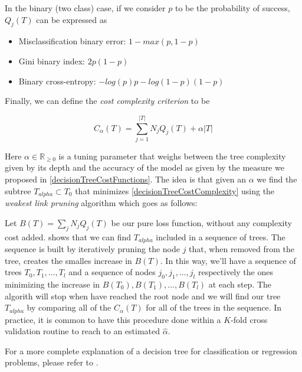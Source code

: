 \documentclass{article}%
\theoremstyle{definition}
\begin{document}
In the binary (two class) case, if we consider $p$ to be the probability of success, $Q_j(T)$ can be expressed as

\begin{itemize}
	\item Misclassification binary error: $1 - max(p, 1-p)$
	\item Gini binary index: $ 2p(1-p) $
	\item Binary cross-entropy: $ -log(p)p - log(1- p)(1-p) $
\end{itemize}\label{decisionTreeCostFunctions}

Finally, we can define the \textit{cost complexity criterion} to be 

\begin{equation}
C_\alpha(T)  = \sum_{j=1}^{|T|} N_j Q_j(T)  + \alpha|T| 
\end{equation}\label{decisionTreeCostComplexity}

Here  $\alpha \in \mathbb{R}_{\geq 0}$ is a tuning parameter that weighs between the tree complexity given by its depth and the accuracy of the model as given by the measure we proposed in \ref{decisionTreeCostFunctions}. The idea is that given an $\alpha$ we find the subtree $T_{alpha} \subset T_0$ that minimizes \ref{decisionTreeCostComplexity} using the \textit{weakest link pruning} algorithm which goes as follows:

Let  $B(T)  = \sum_{j} N_j Q_j(T) $ be our pure loss function, without any complexity cost added. \cite{breiman-cart84} shows that we can find $T_{alpha}$ included in a sequence of trees. The sequence is built by iteratively pruning the node $j$ that, when removed from the tree, creates the smalles increase in $B(T)$. In this way, we'll have a sequence of trees $T_0,T_1,...,T_l$ and a sequence of nodes $j_0, j_1,...,j_l$ respectively the ones minimizing the increase in $B(T_0),B(T_1),...,B(T_l)$ at each step. The algorith will stop when have reached the root node and we will find our tree $T_{alpha}$ by comparing all of the $C_\alpha(T)$ for all of the trees in the sequence. In practice, it is common to have this procedure done within a $K$-fold cross validation routine to reach to an estimated $\hat{\alpha}$.

For a more complete explanation of a decision tree for classification or regression problems, please refer to \cite{breiman-cart84}.


\textit{}

\textit{}

\textit{}
\end{document}
